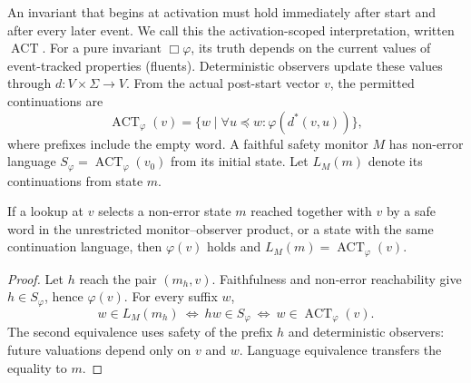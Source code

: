 An invariant that begins at activation must hold immediately after start and after every later event. We call this the activation-scoped interpretation, written $\operatorname{ACT}$. For a pure invariant $\Box\varphi$, its truth depends on the current values of event-tracked properties (fluents). Deterministic observers update these values through $d:V\times\Sigma\to V$. From the actual post-start vector $v$, the permitted continuations are
\[
 \operatorname{ACT}_\varphi(v)=\{w\mid\forall u\preceq w:\varphi(d^*(v,u))\},
\]
where prefixes include the empty word. A faithful safety monitor $M$ has non-error language $S_\varphi=\operatorname{ACT}_\varphi(v_0)$ from its initial state. Let $L_M(m)$ denote its continuations from state $m$.
\begin{proposition}\label{prop:lookup-act}
If a lookup at $v$ selects a non-error state $m$ reached together with $v$ by a safe word in the unrestricted monitor--observer product, or a state with the same continuation language, then $\varphi(v)$ holds and $L_M(m)=\operatorname{ACT}_\varphi(v)$.
\end{proposition}
\begin{proof}
Let $h$ reach the pair $(m_h,v)$. Faithfulness and non-error reachability give $h\in S_\varphi$, hence $\varphi(v)$. For every suffix $w$,
\[
 w\in L_M(m_h)\ \Longleftrightarrow\ hw\in S_\varphi
 \ \Longleftrightarrow\ w\in\operatorname{ACT}_\varphi(v).
\]
The second equivalence uses safety of the prefix $h$ and deterministic observers: future valuations depend only on $v$ and $w$. Language equivalence transfers the equality to $m$.
\end{proof}
